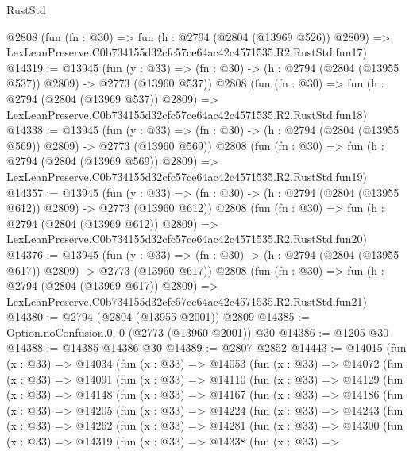 \begin{lexlean}{RustStd}
\begin{coremodule}
    @2808
    (fun (fn : @30) =>
    fun (h : @2794 (@2804 (@13969 @526)) @2809) =>
    LexLeanPreserve.C0b734155d32cfc57ce64ac42c4571535.R2.RustStd.fun17)
@14319 := @13945
    (fun (y : @33) => (fn : @30) -> (h : @2794 (@2804 (@13955 @537)) @2809) -> @2773 (@13960 @537))
    @2808
    (fun (fn : @30) =>
    fun (h : @2794 (@2804 (@13969 @537)) @2809) =>
    LexLeanPreserve.C0b734155d32cfc57ce64ac42c4571535.R2.RustStd.fun18)
@14338 := @13945
    (fun (y : @33) => (fn : @30) -> (h : @2794 (@2804 (@13955 @569)) @2809) -> @2773 (@13960 @569))
    @2808
    (fun (fn : @30) =>
    fun (h : @2794 (@2804 (@13969 @569)) @2809) =>
    LexLeanPreserve.C0b734155d32cfc57ce64ac42c4571535.R2.RustStd.fun19)
@14357 := @13945
    (fun (y : @33) => (fn : @30) -> (h : @2794 (@2804 (@13955 @612)) @2809) -> @2773 (@13960 @612))
    @2808
    (fun (fn : @30) =>
    fun (h : @2794 (@2804 (@13969 @612)) @2809) =>
    LexLeanPreserve.C0b734155d32cfc57ce64ac42c4571535.R2.RustStd.fun20)
@14376 := @13945
    (fun (y : @33) => (fn : @30) -> (h : @2794 (@2804 (@13955 @617)) @2809) -> @2773 (@13960 @617))
    @2808
    (fun (fn : @30) =>
    fun (h : @2794 (@2804 (@13969 @617)) @2809) =>
    LexLeanPreserve.C0b734155d32cfc57ce64ac42c4571535.R2.RustStd.fun21)
@14380 := @2794 (@2804 (@13955 @2001)) @2809
@14385 := Option.noConfusion.{0, 0} (@2773 (@13960 @2001)) @30
@14386 := @1205 @30
@14388 := @14385 @14386 @30
@14389 := @2807 @2852
@14443 := @14015
    (fun (x : @33) =>
    @14034
      (fun (x : @33) =>
      @14053
        (fun (x : @33) =>
        @14072
          (fun (x : @33) =>
          @14091
            (fun (x : @33) =>
            @14110
              (fun (x : @33) =>
              @14129
                (fun (x : @33) =>
                @14148
                  (fun (x : @33) =>
                  @14167
                    (fun (x : @33) =>
                    @14186
                      (fun (x : @33) =>
                      @14205
                        (fun (x : @33) =>
                        @14224
                          (fun (x : @33) =>
                          @14243
                            (fun (x : @33) =>
                            @14262
                              (fun (x : @33) =>
                              @14281
                                (fun (x : @33) =>
                                @14300
                                  (fun (x : @33) =>
                                  @14319
                                    (fun (x : @33) =>
                                    @14338
                                      (fun (x : @33) =>

\end{coremodule}
\end{lexlean}
